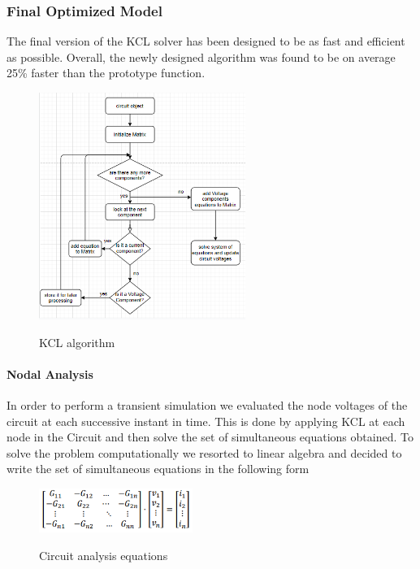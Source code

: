 \documentclass{article}
\begin{document}
\subsubsection{Final Optimized Model}\label{ssec:optimizedmodel}
The final version of the KCL solver has been designed to be as fast and efficient as possible. Overall, the newly designed algorithm was found to be on average 25\% faster than the prototype function.

\begin{figure}[h]
    \caption{KCL algorithm}
    \centering
    \includegraphics[width=0.6\textwidth]{images/KCL_flowchart.PNG}
    \label{fig:KCLFlowchart}
\end{figure}

\paragraph{Nodal Analysis}
In order to perform a transient simulation we evaluated the node voltages of the circuit at each successive instant in time. This is done by applying KCL at each node in the Circuit and then solve the set of simultaneous equations obtained.\medbreak
To solve the problem computationally we resorted to linear algebra and decided to write the set of simultaneous equations in the following form
\begin{figure}[h]
    \caption{Circuit analysis equations}
    \centering
    \includegraphics[width=5cm]{images/Conductance_Matrix.PNG}
    \label{fig:ConductanceMat}
\end{figure}
\end{document}
